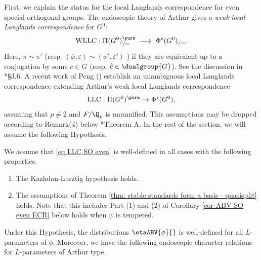 \documentclass[11pt,letterpaper]{amsart}
\numberwithin{equation}{section}
\begin{document}
First, we explain the status for the local Langlands correspondence for even special orthogonal groups. The endoscopic theory of Arthur gives a {\it weak local Langlands correspondence} for $G^0$:
\begin{align*}
    \textrm{WLLC}: \Pi(G^0)^\pure_{/\sim} 
    \ \longrightarrow\  \Phi^{\mathfrak{e}}(G^0)_{/ \sim}.
\end{align*}
Here, $\pi \sim \pi'$ (resp. $(\phi,\varepsilon) \sim (\phi', \varepsilon')$ ) if they are equivalent up to a conjugation by some $c \in G$ (resp. $\widehat{c}\in \dualgroup{G}$). See the discussion in \cite{AG17}*{\S 3.6}. A recent work of Peng (\cite{Pen25}) establish an unambiguous local Langlands correspondence extending Arthur's weak local Langlands correspondence
\begin{align}\label{eq LLC SO even}
     \textrm{LLC}: \Pi(G^0)^\pure \to \Phi^{\mathfrak{e}}(G^0),
\end{align}
assuming that $p \neq 2$ and $F/\Q_p$ is unramified. This assumptions may be dropped according to Remark(4) below \cite{Pen25}*{Theorem A}. In the rest of the section, we will assume the following Hypothesis.
\begin{hypothesis}\label{hyp LLC even SO}
    We assume that \eqref{eq LLC SO even} is well-defined in all cases with the following properties.
    \begin{enumerate}
        \item The Kazhdan-Lusztig hypothesis holds.
        \item The assumptions of Theorem \ref{thm: stable standards form a basis - quasisplit} holds. Note that this includes Part (1) and (2) of Corollary \ref{cor ABV SO even ECR} below holds when $\psi$ is tempered.
    \end{enumerate}
\end{hypothesis}


Under this Hypothesis, the distributions $\etaABV{\phi}{}$ is well-defined for all $L$-parameters of $\phi$. Moreover, we have the following endoscopic character relations for $L$-parameters of Arthur type.
\end{document}
